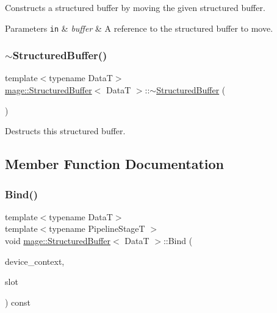 Constructs a structured buffer by moving the given structured buffer.


\begin{DoxyParams}[1]{Parameters}
\mbox{\tt in}  & {\em buffer} & A reference to the structured buffer to move. \\
\hline
\end{DoxyParams}
\hypertarget{classmage_1_1_structured_buffer_a02ab1d322e1aef0c608b85224b80dbcf}{}\label{classmage_1_1_structured_buffer_a02ab1d322e1aef0c608b85224b80dbcf} 
\subsubsection{\texorpdfstring{$\sim$\+Structured\+Buffer()}{~StructuredBuffer()}}
{\footnotesize\ttfamily template$<$typename DataT$>$ \\
\hyperlink{classmage_1_1_structured_buffer}{mage\+::\+Structured\+Buffer}$<$ DataT $>$\+::$\sim$\hyperlink{classmage_1_1_structured_buffer}{Structured\+Buffer} (\begin{DoxyParamCaption}{ }\end{DoxyParamCaption})\hspace{0.3cm}{\ttfamily [default]}}

Destructs this structured buffer. 

\subsection{Member Function Documentation}
\hypertarget{classmage_1_1_structured_buffer_ae3884b12cbf30188089481b39fefa4c2}{}\label{classmage_1_1_structured_buffer_ae3884b12cbf30188089481b39fefa4c2} 
\subsubsection{\texorpdfstring{Bind()}{Bind()}}
{\footnotesize\ttfamily template$<$typename DataT$>$ \\
template$<$typename Pipeline\+StageT $>$ \\
void \hyperlink{classmage_1_1_structured_buffer}{mage\+::\+Structured\+Buffer}$<$ DataT $>$\+::Bind (\begin{DoxyParamCaption}\item[{I\+D3\+D11\+Device\+Context4 $\ast$}]{device\+\_\+context,  }\item[{\hyperlink{namespacemage_a41c104c036fba3756a74e19f793eeaa1}{U32}}]{slot }\end{DoxyParamCaption}) const\hspace{0.3cm}{\ttfamily [noexcept]}}

